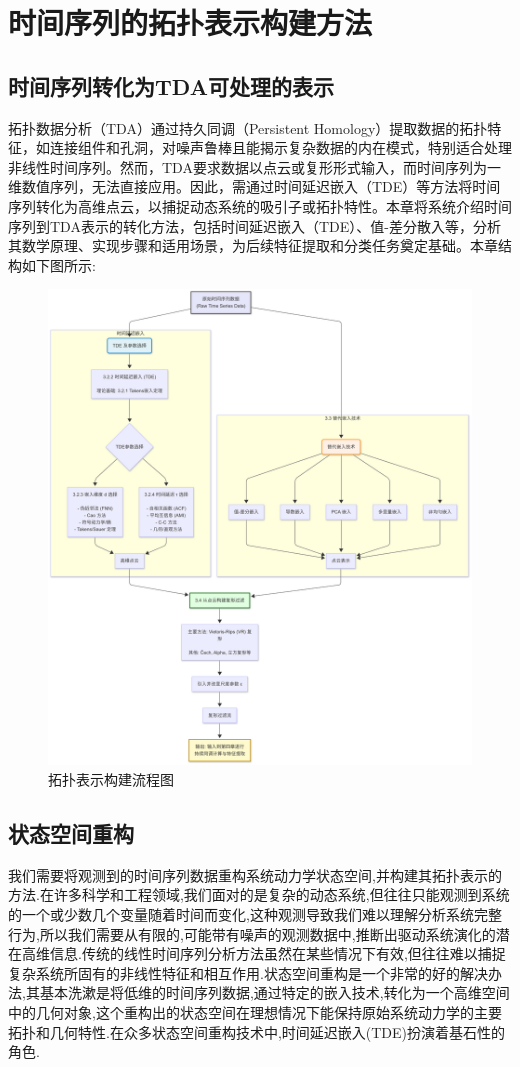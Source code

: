 \section{时间序列的拓扑表示构建方法}
\subsection{时间序列转化为TDA可处理的表示}
拓扑数据分析（TDA）通过持久同调（Persistent Homology）提取数据的拓扑特征，如连接组件和孔洞，对噪声鲁棒且能揭示复杂数据的内在模式，特别适合处理非线性时间序列。然而，TDA要求数据以点云或复形形式输入，而时间序列为一维数值序列，无法直接应用。因此，需通过时间延迟嵌入（TDE）等方法将时间序列转化为高维点云，以捕捉动态系统的吸引子或拓扑特性。本章将系统介绍时间序列到TDA表示的转化方法，包括时间延迟嵌入（TDE）、值-差分散入等，分析其数学原理、实现步骤和适用场景，为后续特征提取和分类任务奠定基础。本章结构如下图所示:
\begin{figure}[thbp!]
    \centering
    \includegraphics[width=.9\textwidth]{figure/第三章.png}
    \caption{拓扑表示构建流程图}
\end{figure}

\subsection{状态空间重构}
我们需要将观测到的时间序列数据重构系统动力学状态空间,并构建其拓扑表示的方法.在许多科学和工程领域,我们面对的是复杂的动态系统,但往往只能观测到系统的一个或少数几个变量随着时间而变化,这种观测导致我们难以理解分析系统完整行为,所以我们需要从有限的,可能带有噪声的观测数据中,推断出驱动系统演化的潜在高维信息.传统的线性时间序列分析方法虽然在某些情况下有效,但往往难以捕捉复杂系统所固有的非线性特征和相互作用.状态空间重构是一个非常的好的解决办法,其基本洗漱是将低维的时间序列数据,通过特定的嵌入技术,转化为一个高维空间中的几何对象,这个重构出的状态空间在理想情况下能保持原始系统动力学的主要拓扑和几何特性.在众多状态空间重构技术中,时间延迟嵌入(TDE)扮演着基石性的角色.
